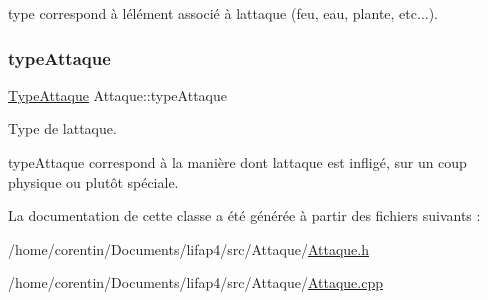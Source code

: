 type correspond à l\textquotesingle{}élément associé à l\textquotesingle{}attaque (feu, eau, plante, etc...). \mbox{\label{class_attaque_a8a430c66f761bd2786f2746f292c7425}} 
\subsubsection{\texorpdfstring{type\+Attaque}{typeAttaque}}
{\footnotesize\ttfamily \hyperlink{_attaque_8h_acefba67470a7a2e69ed731d28d318e64}{Type\+Attaque} Attaque\+::type\+Attaque\hspace{0.3cm}{\ttfamily [private]}}



Type de l\textquotesingle{}attaque. 

type\+Attaque correspond à la manière dont l\textquotesingle{}attaque est infligé, sur un coup physique ou plutôt spéciale. 

La documentation de cette classe a été générée à partir des fichiers suivants \+:\begin{DoxyCompactItemize}
\item 
/home/corentin/\+Documents/lifap4/src/\+Attaque/\hyperlink{_attaque_8h}{Attaque.\+h}\item 
/home/corentin/\+Documents/lifap4/src/\+Attaque/\hyperlink{_attaque_8cpp}{Attaque.\+cpp}\end{DoxyCompactItemize}
